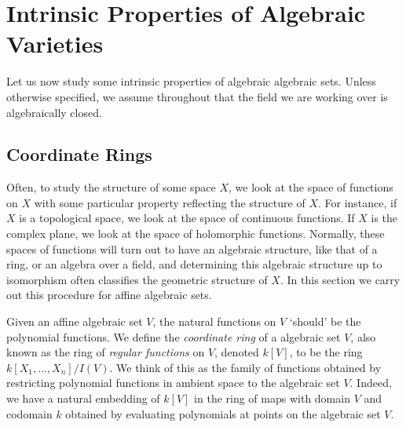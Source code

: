 \chapter{Intrinsic Properties of Algebraic Varieties}

Let us now study some intrinsic properties of algebraic algebraic sets. Unless otherwise specified, we assume throughout that the field we are working over is algebraically closed.

\section{Coordinate Rings}

Often, to study the structure of some space $X$, we look at the space of functions on $X$ with some particular property reflecting the structure of $X$. For instance, if $X$ is a topological space, we look at the space of continuous functions. If $X$ is the complex plane, we look at the space of holomorphic functions. Normally, these spaces of functions will turn out to have an algebraic structure, like that of a ring, or an algebra over a field, and determining this algebraic structure up to isomorphism often classifies the geometric structure of $X$. In this section we carry out this procedure for affine algebraic sets.

Given an affine algebraic set $V$, the natural functions on $V$ `should' be the polynomial functions. We define the \emph{coordinate ring} of a algebraic set $V$, also known as the ring of \emph{regular functions} on $V$, denoted $k[V]$, to be the ring $k[X_1,\dots,X_n]/I(V)$. We think of this as the family of functions obtained by restricting polynomial functions in ambient space to the algebraic set $V$. Indeed, we have a natural embedding of $k[V]$ in the ring of maps with domain $V$ and codomain $k$ obtained by evaluating polynomials at points on the algebraic set $V$.

\begin{comment}
\begin{example}
    If we are working over an infinite field, then the coordinate ring $k[X_1,\dots,X_n]$ is equal to $k[X_1, \dots, X_n]$, because $I(\mathbf{A}^n) = 0$. This is well known in the univariate case. In general, if we have a nonzero polynomial $f(X_1, \dots, X_n,Y)$, then viewing the polynomial as a univariate polynomial in $Y$ with coefficients in $k(X_1, \dots, X_n)$, we conclude that there must be $y \in k$ with $f(X_1, \dots, X_n,y) \neq 0$, and by induction we conclude there are $x_1, \dots, x_n \in k$ with $f(x_1, \dots, x_n, y) \neq 0$. In particular, in an algebraically closed field this will always be true. On the other hand, if we are working over $GF(p^n)$, then every nonzero polynomial $f(X_1, \dots, X_n)$ with degree at most $p^n-1$ in each variable cannot vanish everywhere on $\mathbf{A}^n$, and the polynomials $\smash{X_n^{p^n-1} - 1}$ generate the ideal $I(\mathbf{A}^n)$.
\end{example}
\end{comment}


